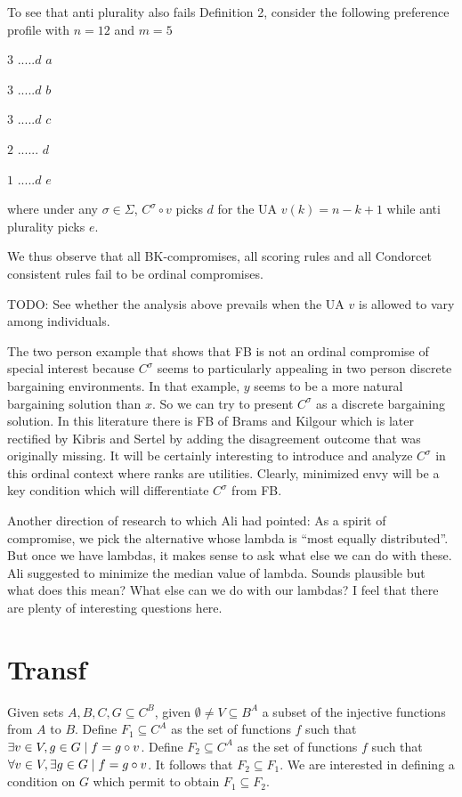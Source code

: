 \documentclass[version=3.21, pagesize, notitlepage, twoside=off, bibliography=totoc, DIV=calc, fontsize=12pt, a4paper]{scrartcl}
\begin{document}
To see that anti plurality also fails Definition 2, consider the following preference profile with $n=12$ and $m=5$

$3$ $.....d$ $a$

$3$ $.....d$ $b$

$3$ $.....d$ $c$

$2$ $......$ $d$

$1$ $.....d$ $e$

\bigskip

where under any $\sigma \in \Sigma $, $C^{\sigma }\circ v$ picks $d$ for the UA $v(k)=n-k+1$ while anti plurality picks $e$.

We thus observe that all BK-compromises, all scoring rules and all Condorcet consistent rules fail to be ordinal compromises.

TODO: See whether the analysis above prevails when the UA $v$ is allowed to vary among individuals.

The two person example that shows that FB is not an ordinal compromise of special interest because $C^{\sigma }$ seems to particularly appealing in two person discrete bargaining environments. In that example, $y$ seems to be a more natural bargaining solution than $x$. So we can try to present $C^{\sigma }$ as a discrete bargaining solution. In this literature there is FB of Brams and Kilgour which is later rectified by Kibris and Sertel \cite{Sertel1999} by adding the disagreement outcome that was originally missing. It will be certainly interesting to introduce and analyze $C^{\sigma }$ in this ordinal context where ranks are utilities. Clearly, minimized envy will be a key condition which will differentiate $C^{\sigma }$ from FB.

Another direction of research to which Ali had pointed: As a spirit of compromise, we pick the alternative whose lambda is “most equally distributed”. But once we have lambdas, it makes sense to ask what else we can do with these. Ali suggested to minimize the median value of lambda. Sounds plausible but what does this mean? What else can we do with our lambdas? I feel that there are plenty of interesting questions here.




\appendix
\section{Transf}
Given sets $A, B, C, G \subseteq C^B$, given $\emptyset ≠ V \subseteq B^A$ a subset of the injective functions from $A$ to $B$. Define $F_1 \subseteq C^A$ as the set of functions $f$ such that $\exists v \in V, g \in G \suchthat f = g \circ v$. Define $F_2 \subseteq C^A$ as the set of functions $f$ such that $\forall v \in V, \exists g \in G \suchthat f = g \circ v$. It follows that $F_2 \subseteq F_1$. We are interested in defining a condition on $G$ which permit to obtain $F_1 \subseteq F_2$. 
\end{document}
